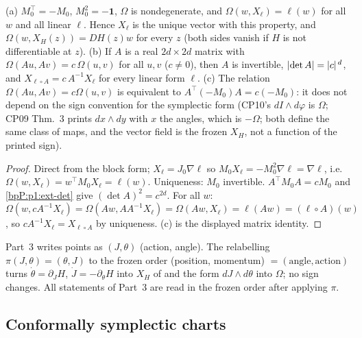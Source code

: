 \begin{lemma}\label{bpP:p1:omega-algebra}
(a) $M_0^{\top}=-M_0$, $M_0^2=-\mathbf 1$, $\Omega$ is nondegenerate, and $\Omega(w,X_\ell)=\ell(w)$ for all $w$ and all linear $\ell$. Hence $X_\ell$ is the unique vector with this property, and $\Omega(w,X_H(z))=DH(z)w$ for every $z$ (both sides vanish if $H$ is not differentiable at $z$).
(b) If $A$ is a real $2d\times2d$ matrix with $\Omega(Au,Av)=c\,\Omega(u,v)$ for all $u,v$ ($c\ne0$), then $A$ is invertible, $\lvert \det A\rvert=\lvert c\rvert^{\,d}$, and $X_{\ell\circ A}=c\,A^{-1}X_\ell$ for every linear form $\ell$.
(c) The relation $\Omega(Au,Av)=c\Omega(u,v)$ is equivalent to $A^{\top}(-M_0)A=c(-M_0)$: it does not depend on the sign convention for the symplectic form (CP10's $dI\wedge d\varphi$ is $\Omega$; CP09 Thm.~3 prints $dx\wedge dy$ with $x$ the angles, which is $-\Omega$; both define the same class of maps, and the vector field is the frozen $X_H$, not a function of the printed sign).
\end{lemma}
\begin{proof}
\label{stepP:p1:oa-mat} Direct from the block form; $X_\ell=J_0\nabla\ell$ so $M_0X_\ell=-M_0^2\nabla\ell=\nabla\ell$, i.e.\ $\Omega(w,X_\ell)=w^{\top}M_0X_\ell=\ell(w)$. Uniqueness: $M_0$ invertible.
\label{stepP:p1:oa-b} $A^{\top}M_0A=cM_0$ and \ref{bpP:p1:ext-det} give $(\det A)^2=c^{2d}$. For all $w$: $\Omega(w,cA^{-1}X_\ell)=\Omega(Aw,AA^{-1}X_\ell)=\Omega(Aw,X_\ell)=\ell(Aw)=(\ell\circ A)(w)$, so $cA^{-1}X_\ell=X_{\ell\circ A}$ by uniqueness. (c) is the displayed matrix identity.
\end{proof}

\begin{remark}\label{bpP:p1:order}
Part~3 writes points as $(J,\theta)$ (action, angle). The relabelling $\pi(J,\theta)=(\theta,J)$ to the frozen order (position, momentum) $=(\text{angle},\text{action})$ turns $\dot\theta=\partial_JH$, $\dot J=-\partial_\theta H$ into $X_H$ of  and the form $dJ\wedge d\theta$ into $\Omega$; no sign changes. All statements of Part~3 are read in the frozen order after applying $\pi$.
\end{remark}

\subsection{Conformally symplectic charts}\label{bpP:p1:charts}

